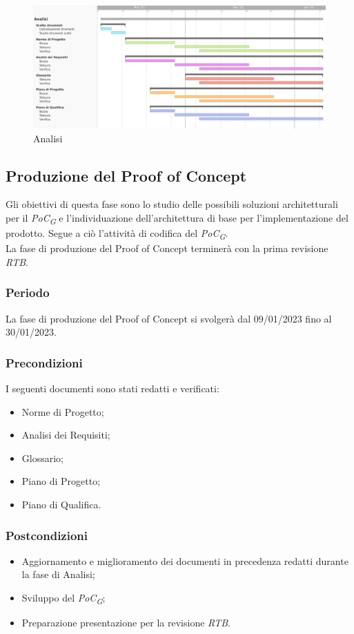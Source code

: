 \begin{figure}[H]
\centering
\includegraphics[width=\textwidth]{img/4_analisi.png}
\caption{Analisi}
\end{figure}

\subsection{Produzione del Proof of Concept}
Gli obiettivi di questa fase sono lo studio delle possibili soluzioni architetturali per il \textit{PoC\textsubscript{G}} e l’individuazione dell’architettura di base per l’implementazione del prodotto. Segue a ciò l’attività di codifica del \textit{PoC\textsubscript{G}}.\\
La fase di produzione del Proof of Concept terminerà con la prima revisione \textit{RTB}.

\subsubsection{Periodo}
La fase di produzione del Proof of Concept si svolgerà dal 09/01/2023 fino al 30/01/2023.

\subsubsection{Precondizioni}
I seguenti documenti sono stati redatti e verificati:
\begin{itemize}
	\item Norme di Progetto;
	\item Analisi dei Requisiti;
	\item Glossario;
    \item Piano di Progetto;
	\item Piano di Qualifica.
\end{itemize}

\subsubsection{Postcondizioni}\:
\begin{itemize}
	\item Aggiornamento e miglioramento dei documenti in precedenza redatti durante la fase di Analisi;
	\item Sviluppo del \textit{PoC\textsubscript{G}};
	\item Preparazione presentazione per la revisione \textit{RTB}.
\end{itemize}

